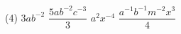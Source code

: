 %
%
    \begin{tasks}(4)
        \task \(3ab^{-2}\)
        \task \(\dfrac{5ab^{-2}c^{-3}}{3}\)
        \task \(a^2x^{-4}\)
        \task \(\dfrac{a^{-1}b^{-1}m^{-2}x^3}{4}\)
    \end{tasks}
